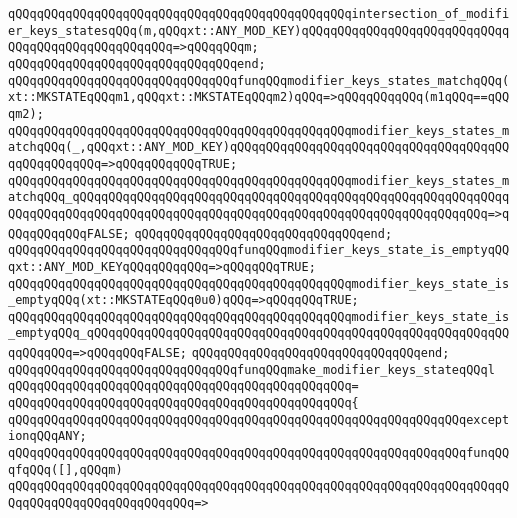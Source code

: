 \verb|qQQqqQQqqQQqqQQqqQQqqQQqqQQqqQQqqQQqqQQqqQQqqQQqintersection_of_modifier_keys_statesqQQq(m,qQQqxt::ANY_MOD_KEY)qQQqqQQqqQQqqQQqqQQqqQQqqQQqqQQqqQQqqQQqqQQqqQQqqQQq=>qQQqqQQqm;|\newline
\verb|qQQqqQQqqQQqqQQqqQQqqQQqqQQqqQQqend;|\newline
\newline
\verb|qQQqqQQqqQQqqQQqqQQqqQQqqQQqqQQqfunqQQqmodifier_keys_states_matchqQQq(xt::MKSTATEqQQqm1,qQQqxt::MKSTATEqQQqm2)qQQq=>qQQqqQQqqQQq(m1qQQq==qQQqm2);|\newline
\verb|qQQqqQQqqQQqqQQqqQQqqQQqqQQqqQQqqQQqqQQqqQQqqQQqmodifier_keys_states_matchqQQq(_,qQQqxt::ANY_MOD_KEY)qQQqqQQqqQQqqQQqqQQqqQQqqQQqqQQqqQQqqQQqqQQqqQQqqQQq=>qQQqqQQqqQQqTRUE;|\newline
\verb|qQQqqQQqqQQqqQQqqQQqqQQqqQQqqQQqqQQqqQQqqQQqqQQqmodifier_keys_states_matchqQQq_qQQqqQQqqQQqqQQqqQQqqQQqqQQqqQQqqQQqqQQqqQQqqQQqqQQqqQQqqQQqqQQqqQQqqQQqqQQqqQQqqQQqqQQqqQQqqQQqqQQqqQQqqQQqqQQqqQQqqQQqqQQqqQQq=>qQQqqQQqqQQqFALSE;|\newline
\verb|qQQqqQQqqQQqqQQqqQQqqQQqqQQqqQQqend;|\newline
\newline
\verb|qQQqqQQqqQQqqQQqqQQqqQQqqQQqqQQqfunqQQqmodifier_keys_state_is_emptyqQQqxt::ANY_MOD_KEYqQQqqQQqqQQq=>qQQqqQQqTRUE;|\newline
\verb|qQQqqQQqqQQqqQQqqQQqqQQqqQQqqQQqqQQqqQQqqQQqqQQqmodifier_keys_state_is_emptyqQQq(xt::MKSTATEqQQq0u0)qQQq=>qQQqqQQqTRUE;|\newline
\verb|qQQqqQQqqQQqqQQqqQQqqQQqqQQqqQQqqQQqqQQqqQQqqQQqmodifier_keys_state_is_emptyqQQq_qQQqqQQqqQQqqQQqqQQqqQQqqQQqqQQqqQQqqQQqqQQqqQQqqQQqqQQqqQQqqQQqqQQq=>qQQqqQQqFALSE;|\newline
\verb|qQQqqQQqqQQqqQQqqQQqqQQqqQQqqQQqend;|\newline
\newline
\verb|qQQqqQQqqQQqqQQqqQQqqQQqqQQqqQQqfunqQQqmake_modifier_keys_stateqQQql|\newline
\verb|qQQqqQQqqQQqqQQqqQQqqQQqqQQqqQQqqQQqqQQqqQQqqQQq=|\newline
\verb|qQQqqQQqqQQqqQQqqQQqqQQqqQQqqQQqqQQqqQQqqQQqqQQq{|\newline
\verb|qQQqqQQqqQQqqQQqqQQqqQQqqQQqqQQqqQQqqQQqqQQqqQQqqQQqqQQqqQQqqQQqexceptionqQQqANY;|\newline
\newline
\verb|qQQqqQQqqQQqqQQqqQQqqQQqqQQqqQQqqQQqqQQqqQQqqQQqqQQqqQQqqQQqqQQqfunqQQqfqQQq([],qQQqm)|\newline
\verb|qQQqqQQqqQQqqQQqqQQqqQQqqQQqqQQqqQQqqQQqqQQqqQQqqQQqqQQqqQQqqQQqqQQqqQQqqQQqqQQqqQQqqQQqqQQqqQQq=>|\newline
